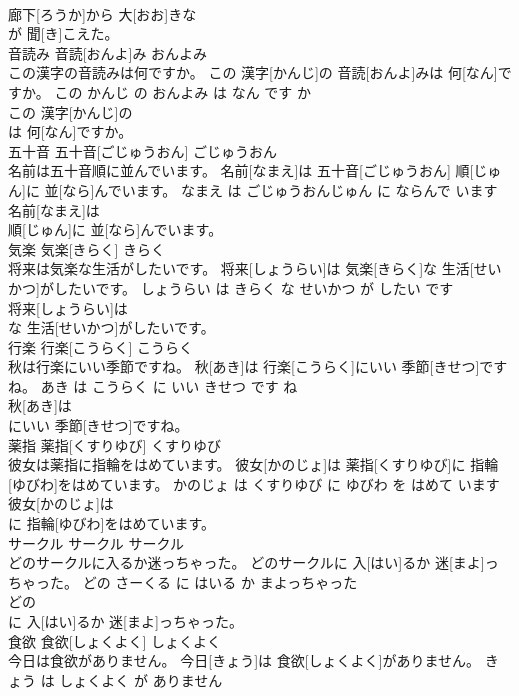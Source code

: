 \documentclass[8pt]{extreport}
\begin{document}
\begin{CJK}{UTF8}{min}
\\	廊下[ろうか]から 大[おお]きな
\\	が 聞[き]こえた。			
\\	音読み	音読[おんよ]み	おんよみ	
\\	この漢字の音読みは何ですか。	この 漢字[かんじ]の 音読[おんよ]みは 何[なん]ですか。	この かんじ の おんよみ は なん です か	
\\	この 漢字[かんじ]の
\\	は 何[なん]ですか。			
\\	五十音	五十音[ごじゅうおん]	ごじゅうおん	
\\	名前は五十音順に並んでいます。	名前[なまえ]は 五十音[ごじゅうおん] 順[じゅん]に 並[なら]んでいます。	なまえ は ごじゅうおんじゅん に ならんで います	
\\	名前[なまえ]は
\\	順[じゅん]に 並[なら]んでいます。			
\\	気楽	気楽[きらく]	きらく	
\\	将来は気楽な生活がしたいです。	将来[しょうらい]は 気楽[きらく]な 生活[せいかつ]がしたいです。	しょうらい は きらく な せいかつ が したい です	
\\	将来[しょうらい]は
\\	な 生活[せいかつ]がしたいです。			
\\	行楽	行楽[こうらく]	こうらく	
\\	秋は行楽にいい季節ですね。	秋[あき]は 行楽[こうらく]にいい 季節[きせつ]ですね。	あき は こうらく に いい きせつ です ね	
\\	秋[あき]は
\\	にいい 季節[きせつ]ですね。			
\\	薬指	薬指[くすりゆび]	くすりゆび	
\\	彼女は薬指に指輪をはめています。	彼女[かのじょ]は 薬指[くすりゆび]に 指輪[ゆびわ]をはめています。	かのじょ は くすりゆび に ゆびわ を はめて います	
\\	彼女[かのじょ]は
\\	に 指輪[ゆびわ]をはめています。			
\\	サークル	サークル	サークル	
\\	どのサークルに入るか迷っちゃった。	どのサークルに 入[はい]るか 迷[まよ]っちゃった。	どの さーくる に はいる か まよっちゃった	
\\	どの
\\	に 入[はい]るか 迷[まよ]っちゃった。			
\\	食欲	食欲[しょくよく]	しょくよく	
\\	今日は食欲がありません。	今日[きょう]は 食欲[しょくよく]がありません。	きょう は しょくよく が ありません	

\end{CJK}
\end{document}

